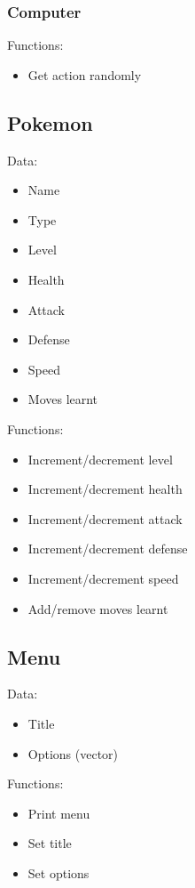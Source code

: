 \documentclass{article}
\begin{document}
  \subsubsection{Computer}
  Functions:
  \begin{itemize}
    \item Get action randomly
  \end{itemize}
    
  \subsection{Pokemon}
  Data:
  \begin{itemize}
    \item Name
    \item Type
    \item Level
    \item Health
    \item Attack
    \item Defense
    \item Speed
    \item Moves learnt
  \end{itemize}
  Functions:
  \begin{itemize}
    \item Increment/decrement level
    \item Increment/decrement health
    \item Increment/decrement attack
    \item Increment/decrement defense
    \item Increment/decrement speed
    \item Add/remove moves learnt
  \end{itemize}
  
  \subsection{Menu}
  Data:
  \begin{itemize}
    \item Title
    \item Options (vector)
  \end{itemize}
  Functions:
  \begin{itemize}
    \item Print menu
    \item Set title
    \item Set options
  \end{itemize}
  
  \pagebreak
  
\end{document}
